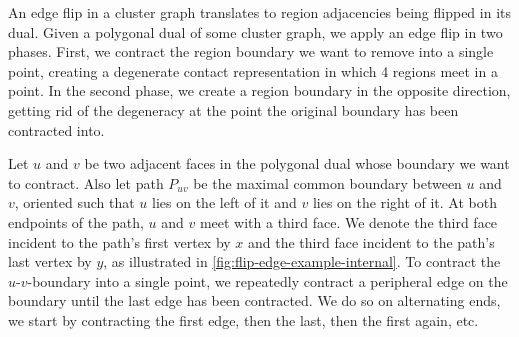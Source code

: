 An edge flip in a cluster graph translates to region adjacencies being flipped in its dual.
Given a polygonal dual of some cluster graph, we apply an edge flip in two phases.
First, we contract the region boundary we want to remove into a single point, creating a degenerate contact representation in which 4 regions meet in a point.
In the second phase, we create a region boundary in the opposite direction, getting rid of the degeneracy at the point the original boundary has been contracted into.

Let $u$ and $v$ be two adjacent faces in the polygonal dual whose boundary we want to contract.
Also let path $P_{uv}$ be the maximal common boundary between $u$ and $v$, oriented such that $u$ lies on the left of it and $v$ lies on the right of it.
At both endpoints of the path, $u$ and $v$ meet with a third face.
We denote the third face incident to the path's first vertex by $x$ and the third face incident to the path's last vertex by $y$, as illustrated in \cref{fig:flip-edge-example-internal}.
To contract the $u$-$v$-boundary into a single point, we repeatedly contract a peripheral edge on the boundary until the last edge has been contracted.
We do so on alternating ends, \ie{} we start by contracting the first edge, then the last, then the first again, etc.

